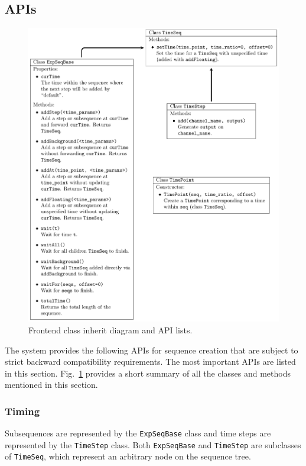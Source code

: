 \subsection{APIs}
\label{ch:computer-control:frontend:api}
\begin{figure}
  \centering
  \includegraphics[width=\textwidth]{figures/computer_control_frontend_classes.pdf}
  \caption[Frontend API classes]{
    Frontend class inherit diagram and API lists.
    \label{fig:computer-control:frontend:classes}}
\end{figure}

The system provides the following APIs for sequence creation
that are subject to strict backward compatibility requirements.
The most important APIs are listed in this section.
Fig.~\ref{fig:computer-control:frontend:classes}
provides a short summary of all the classes and methods mentioned in this section.

\subsubsection{Timing}
Subsequences are represented by the \lstinline{ExpSeqBase} class
and time steps are represented by the \lstinline{TimeStep} class.
Both \lstinline{ExpSeqBase} and \lstinline{TimeStep} are subclasses of \lstinline{TimeSeq},
which represent an arbitrary node on the sequence tree.

